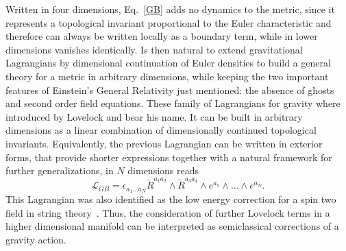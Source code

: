 \documentclass[aps,prd,12pt,superscriptaddress,showpacs,showkeys,longbibliography,reprint]{revtex4-1}
\begin{document}
Written in four dimensions, Eq.~\eqref{GB} adds no dynamics to the metric, since it represents a topological invariant proportional to the Euler characteristic and therefore can always be written locally as a boundary term, while in lower dimensions vanishes identically. Is then natural to extend gravitational Lagrangians by dimensional continuation of Euler densities to build a general theory for a metric in arbitrary dimensions, while keeping the two important features of Einstein's General Relativity just mentioned: the absence of ghosts and second order field equations. These family of Lagrangians for gravity where introduced by Lovelock and bear his name. It can be built in arbitrary dimensions as a linear combination of dimensionally continued topological invariants. Equivalently, the previous Lagrangian can be written in exterior forms, that provide shorter expressions together with a natural framework for further generalizations, in $N$ dimensions reads
\begin{equation}\label{GB2}
\mathcal{L}_{GB} = \epsilon_{a_1...a_N} \tilde{R}^{a_1a_2}\wedge\tilde{R}^{a_3a_4}\wedge e^{a_5}\wedge...\wedge e^{a_N}.
\end{equation}
This Lagrangian was also identified as the low energy correction for a spin two field in string theory~\cite{Zwiebach:1985uq}. Thus, the consideration of further Lovelock terms in a higher dimensional manifold can be interpreted as semiclassical corrections of a gravity action.
\end{document}
